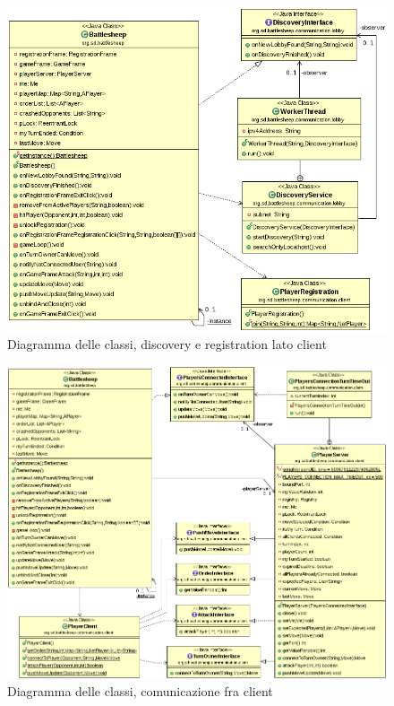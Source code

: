 \documentclass[a4paper,10pt]{scrartcl}
\begin{document}
\begin{figure}[!ht]
    \centering
\includegraphics[width=1.0\textwidth]{core/imgs/UML/RegistrationBattlesheepCommunicationUML.png}
    \caption{Diagramma delle classi, discovery e registration lato client}
    \label{fig:classlobbyclientside}
\end{figure}

\begin{figure}[!ht]
    \centering
\includegraphics[width=1.0\textwidth]{core/imgs/UML/GameBattlesheepCommunicationUML.png}
    \caption{Diagramma delle classi, comunicazione fra client}
    \label{fig:classgame}
\end{figure}
\end{document}
